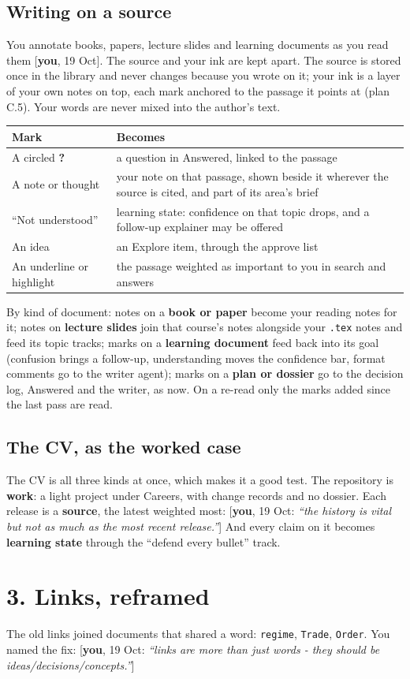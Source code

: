 \documentclass[10pt]{extarticle}
\newcommand{\you}[2]{{\small[\textbf{you}, #1: \textit{``#2''}]}}
\newcommand{\youx}[1]{{\small[\textbf{you}, #1]}}
\newcommand{\Sec}[1]{\section*{#1}}
\newcommand{\Sub}[1]{\subsection*{#1}}
\begin{document}
\Sub{Writing on a source}
You annotate books, papers, lecture slides and learning documents as you read them \youx{19 Oct}. The source and your ink are kept apart. The source is stored once in the library and never changes because you wrote on it; your ink is a layer of your own notes on top, each mark anchored to the passage it points at (plan C.5). Your words are never mixed into the author's text.

\begin{tabularx}{\linewidth}{@{}l Y@{}}
\toprule
Mark & Becomes \\
\midrule
A circled \textbf{?} & a question in Answered, linked to the passage \\
A note or thought & your note on that passage, shown beside it wherever the source is cited, and part of its area's brief \\
``Not understood'' & learning state: confidence on that topic drops, and a follow-up explainer may be offered \\
An idea & an Explore item, through the approve list \\
An underline or highlight & the passage weighted as important to you in search and answers \\
\bottomrule
\end{tabularx}

\medskip
By kind of document: notes on a \textbf{book or paper} become your reading notes for it; notes on \textbf{lecture slides} join that course's notes alongside your \texttt{.tex} notes and feed its topic tracks; marks on a \textbf{learning document} feed back into its goal (confusion brings a follow-up, understanding moves the confidence bar, format comments go to the writer agent); marks on a \textbf{plan or dossier} go to the decision log, Answered and the writer, as now. On a re-read only the marks added since the last pass are read.

\Sub{The CV, as the worked case}
The CV is all three kinds at once, which makes it a good test. The repository is \textbf{work}: a light project under Careers, with change records and no dossier. Each release is a \textbf{source}, the latest weighted most: \you{19 Oct}{the history is vital but not as much as the most recent release.} And every claim on it becomes \textbf{learning state} through the ``defend every bullet'' track.

\clearpage
\Sec{3. Links, reframed}

The old links joined documents that shared a word: \texttt{regime}, \texttt{Trade}, \texttt{Order}. You named the fix: \you{19 Oct}{links are more than just words - they should be ideas/decisions/concepts.}
\end{document}
